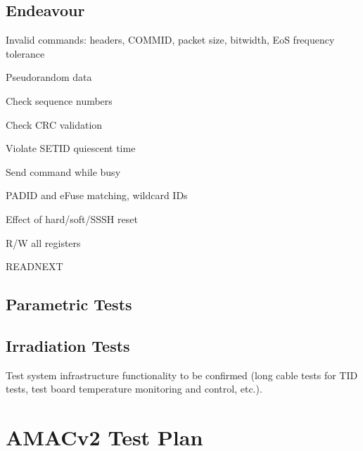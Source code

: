 \documentclass[11pt]{article}   			%
\begin{document}
\subsection{Endeavour}
\begin{compactitem}
    \item{Invalid commands: headers, COMMID, packet size, bitwidth, EoS frequency tolerance}
    \item{Pseudorandom data}
    \item{Check sequence numbers}
    \item{Check CRC validation}
    \item{Violate SETID quiescent time}
    \item{Send command while busy}
    \item{PADID and eFuse matching, wildcard IDs}
    \item{Effect of hard/soft/SSSH reset}
    \item{R/W all registers}
    \item{READNEXT}
\end{compactitem}
 
\subsection{Parametric Tests}
 
\subsection{Irradiation Tests}
Test system infrastructure functionality to be confirmed (long cable tests for TID tests, 
test board temperature monitoring and control, etc.).

\newpage

\section{AMACv2 Test Plan}
\end{document}
